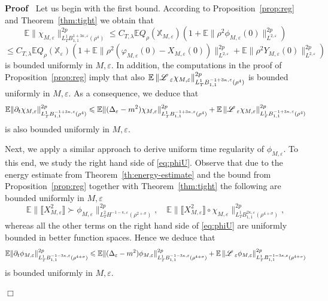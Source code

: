 \documentclass[a4paper,11pt]{article}
\newenvironment{proof}{\noindent\textbf{Proof\ }}{\hspace*{\fill}$\Box$\medskip}
\numberwithin{equation}{section}
\newcommand{\LL}{\mathscr{L} \hspace{.2em}}
\begin{document}
\begin{proof}
  Let us begin with the first bound. According to Proposition~\ref{prop:reg} and
  Theorem~\ref{thm:tight} we obtain that
  \[ \mathbb{E} \| \chi_{M, \varepsilon} \|^{2 p}_{L^1_T B_{1, 1}^{1 + 3
     \kappa, \varepsilon} (\rho^4)} \leqslant C_{T,\lambda} \mathbb{E}Q_{\rho}
     (\mathbb{X}_{M, \varepsilon}) (1 +\mathbb{E}\| \rho^2 \phi_{M,
     \varepsilon} (0)\|^{2 p}_{L^{2, \varepsilon}}) \]
  \[ \leqslant C_{T,\lambda} \mathbb{E}Q_{\rho} (\mathbb{X}_{\varepsilon}) (1
     +\mathbb{E}\| \rho^2 (\varphi_{M, \varepsilon} (0) - X_{M, \varepsilon}
     (0)) \|^{2 p}_{L^{2, \varepsilon}} +\mathbb{E}\| \rho^2 Y_{M,
     \varepsilon} (0)\|^{2 p}_{L^{2, \varepsilon}}) \]
  is bounded uniformly in $M, \varepsilon$. In addition, the computations in
  the proof of Proposition~\ref{prop:reg} imply that also $\mathbb{E} \left\|
  \LL_{\varepsilon} \chi_{M, \varepsilon} \right\|^{2 p}_{L_T^1 B_{1, 1}^{- 1
  + 3 \kappa, \varepsilon} (\rho^4)}$ is bounded uniformly in $M,
  \varepsilon$. As a consequence, we deduce that
  \[ \mathbb{E} \| \partial_t \chi_{M, \varepsilon} \|^{2 p}_{L^1_T B^{- 1 + 3
     \kappa, \varepsilon}_{1, 1} (\rho^4)} \leqslant \mathbb{E} \|
     (\Delta_{\varepsilon} - m^2) \chi_{M, \varepsilon} \|^{2 p}_{L^1_T B^{- 1
     + 3 \kappa, \varepsilon}_{1, 1} (\rho^4)} +\mathbb{E} \left\|
     \LL_{\varepsilon} \chi_{M, \varepsilon} \right\|^{2 p}_{L^1_T B^{- 1 + 3
     \kappa, \varepsilon}_{1, 1} (\rho^4)} \]
  is also bounded uniformly in $M, \varepsilon$.
  
  Next, we apply a similar approach to derive uniform time regularity of
  $\phi_{M, \varepsilon}$. To this end, we study the right hand side of
  {\eqref{eq:phiU}}. Observe that due to the energy estimate from Theorem~\ref{th:energy-estimate} and the bound from Proposition~\ref{prop:reg} together
  with Theorem~\ref{thm:tight} the following are bounded uniformly in $M,
  \varepsilon$
  \[ \mathbb{E} \| \llbracket X_{M, \varepsilon}^2 \rrbracket \succ \phi_{M,
     \varepsilon} \|^{2 p}_{L^2_T H^{- 1 - \kappa, \varepsilon} (\rho^{2 +
     \sigma})}, \hspace{1em} \mathbb{E} \| \llbracket X_{M, \varepsilon}^2
     \rrbracket \circ \chi_{M, \varepsilon} \|^{2 p}_{L^1_T B^{2 \kappa,\varepsilon}_{1,
     1} (\rho^{4 + \sigma})}, \]
  whereas all the other terms on the right hand side of {\eqref{eq:phiU}} are
  uniformly bounded in better function spaces. Hence we deduce that
  \[ \mathbb{E} \| \partial_t \phi_{M, \varepsilon} \|^{2 p}_{L_T^1 B^{- 1 - 3
     \kappa, \varepsilon}_{1, 1} (\rho^{4 + \sigma})} \leqslant \mathbb{E} \|
     (\Delta_{\varepsilon} - m^2) \phi_{M, \varepsilon} \|^{2 p}_{L^1_T B^{- 1
     - 3 \kappa, \varepsilon}_{1, 1} (\rho^{4 + \sigma})} +\mathbb{E} \left\|
     \LL_{\varepsilon} \phi_{M, \varepsilon} \right\|^{2 p}_{L^1_T B^{- 1 - 3
     \kappa, \varepsilon}_{1, 1} (\rho^{4 + \sigma})} \]
  is bounded uniformly in $M, \varepsilon$.
  

\end{proof}
\end{document}
